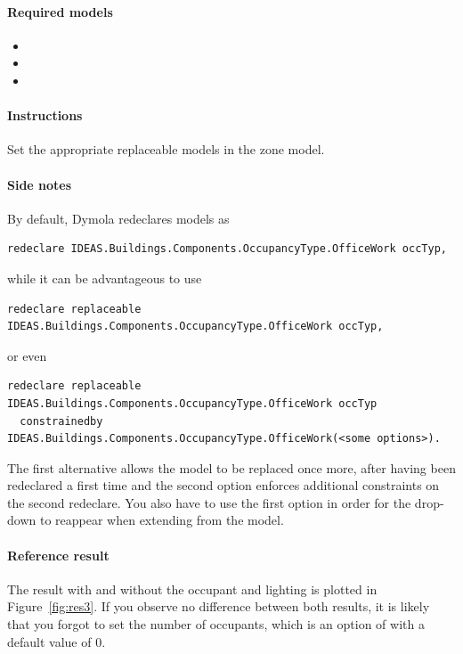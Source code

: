 \documentclass[10pt,a4paper]{article}
\begin{document}
\paragraph{Required models}
\begin{itemize}
\item {}
\item {}
\item {}
\end{itemize}

\paragraph{Instructions}
Set the appropriate replaceable models in the zone model.

\paragraph{Side notes}
By default, Dymola redeclares models as
\begin{verbatim}
redeclare IDEAS.Buildings.Components.OccupancyType.OfficeWork occTyp,
\end{verbatim}
while it can be advantageous to use
\begin{verbatim}
redeclare replaceable IDEAS.Buildings.Components.OccupancyType.OfficeWork occTyp,
\end{verbatim}
or even
\begin{verbatim}
redeclare replaceable IDEAS.Buildings.Components.OccupancyType.OfficeWork occTyp
  constrainedby IDEAS.Buildings.Components.OccupancyType.OfficeWork(<some options>).
\end{verbatim}
The first alternative allows the model to be replaced once more, 
after having been redeclared a first time and the second option
enforces additional constraints on the second redeclare.
You also have to use the first option in order for the drop-down
to reappear when extending from the model.

\paragraph{Reference result}
The result with and without the occupant and lighting
is plotted in Figure~\ref{fig:res3}.
If you observe no difference between both results, 
it is likely that you forgot to set the number of occupants,
which is an option of 
with a default value of 0.
\end{document}
